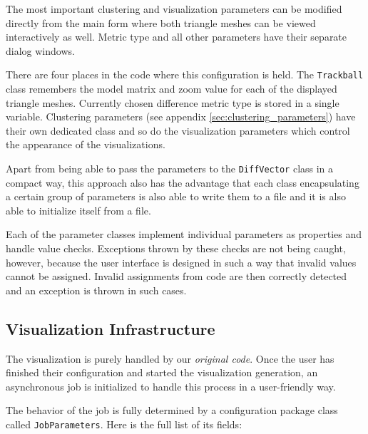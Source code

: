 The most important clustering and visualization parameters can be modified directly from the main form where both triangle meshes can be viewed interactively as well. Metric type and all other parameters have their separate dialog windows.

There are four places in the code where this configuration is held. The \verb+Trackball+ class remembers the model matrix and zoom value for each of the displayed triangle meshes. Currently chosen difference metric type is stored in a single variable. Clustering parameters (see appendix \ref{sec:clustering_parameters}) have their own dedicated class and so do the visualization parameters which control the appearance of the visualizations.

Apart from being able to pass the parameters to the \verb+DiffVector+ class in a compact way, this approach also has the advantage that each class encapsulating a certain group of parameters is also able to write them to a file and it is also able to initialize itself from a file\footnotemark.


Each of the parameter classes implement individual parameters as properties and handle value checks. Exceptions thrown by these checks are not being caught, however, because the user interface is designed in such a way that invalid values cannot be assigned. Invalid assignments from code are then correctly detected and an exception is thrown in such cases.
\subsection{Visualization Infrastructure}

The visualization is purely handled by our {\it original code}. Once the user has finished their configuration and started the visualization generation, an asynchronous job is initialized to handle this process in a user-friendly way.

The behavior of the job is fully determined by a configuration package class called \verb+JobParameters+. Here is the full list of its fields:

